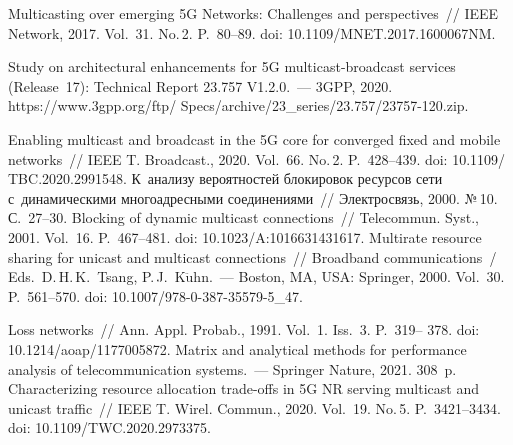 \begin{multicols}{2}
{{\begin{thebibliography}{99}
 Multicasting over emerging 
5G Networks: Challenges and perspectives~// IEEE Network, 2017. Vol.~31. No.\,2. P.~80--89. 
doi: 10.1109/MNET.2017.1600067NM.

Study on architectural enhancements for 5G multicast-broadcast services (Release~17): Technical 
Report 23.757 V1.2.0.~--- 3GPP, 2020. {\sf 
https://www.3gpp.org/ftp/ Specs/archive/23\_series/23.757/23757-120.zip}.

 Enabling multicast and broadcast in the 5G core for 
converged fixed and mobile networks~// IEEE T. Broadcast., 2020. Vol.~66. No.\,2.  
P.~428--439. doi: 10.1109/ TBC.2020.2991548.
 К~анализу вероятностей блокировок ресурсов сети 
с~динамическими многоадресными со\-еди\-не\-ни\-ями~// Электросвязь, 2000. №\,10. С.~27--30.
 Blocking of dynamic multicast 
connections~// Telecommun. Syst., 2001. Vol.~16. P.~467--481. doi: 10.1023/A:1016631431617.
 Multirate resource sharing for unicast and multicast connections~// 
Broadband communications~/ Eds.\ D.\,H.\,K.~Tsang, P.\,J.~K$\ddot{\mbox{u}}$hn.~--- Boston, MA, USA: Springer, 2000. Vol.~30. P.~561--570. doi: 
10.1007/978-0-387-35579-5\_47.

\pagebreak

 Loss networks~// Ann. Appl. Probab., 1991. Vol.~1. Iss.~3.  
P.~319-- 378.  doi: 
10.1214/aoap/1177005872.
 Matrix and analytical methods for 
performance analysis of telecommunication systems.~--- Springer Nature, 2021. 308~p.
 Characterizing resource allocation trade-offs in 5G 
NR serving multicast and unicast traffic~// IEEE T. Wirel. Commun., 2020. Vol.~19. No.\,5. 
P.~3421--3434. doi: 10.1109/TWC.2020.2973375.

\end{thebibliography}

 }
 }

\end{multicols}

